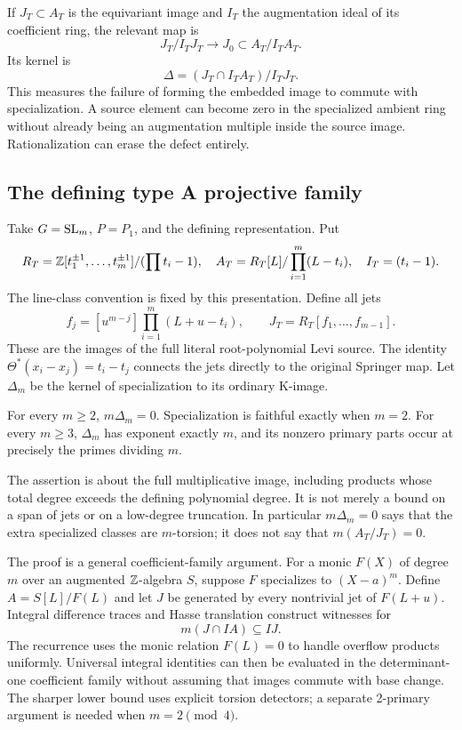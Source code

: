 If $J_T\subset A_T$ is the equivariant image and $I_T$ the augmentation ideal of its coefficient ring, the relevant map is
\[
 J_T/I_TJ_T\longrightarrow J_0\subset A_T/I_TA_T.
\]
Its kernel is
\[
 \Delta=(J_T\cap I_TA_T)/I_TJ_T.
\]
This measures the failure of forming the embedded image to commute with specialization. A source element can become zero in the specialized ambient ring without already being an augmentation multiple inside the source image. Rationalization can erase the defect entirely.

\subsection{The defining type A projective family}
Take $G=\operatorname{SL}_m$, $P=P_1$, and the defining representation. Put
\[
 R_T=\mathbb Z[t_1^{\pm1},\ldots,t_m^{\pm1}]/(\prod t_i-1),\quad
 A_T=R_T[L]/\prod_{i=1}^m(L-t_i),\quad I_T=(t_i-1).
\]
The line-class convention is fixed by this presentation. Define all jets
\[
 f_j=[u^{m-j}]\prod_{i=1}^m(L+u-t_i),\qquad
 J_T=R_T[f_1,\ldots,f_{m-1}].
\]
These are the images of the full literal root-polynomial Levi source. The identity $\Theta^*(x_i-x_j)=t_i-t_j$ connects the jets directly to the original Springer map. Let $\Delta_m$ be the kernel of specialization to its ordinary K-image.

\begin{theorem}
For every $m\ge2$, $m\Delta_m=0$. Specialization is faithful exactly when $m=2$. For every $m\ge3$, $\Delta_m$ has exponent exactly $m$, and its nonzero primary parts occur at precisely the primes dividing $m$.
\end{theorem}
The assertion is about the full multiplicative image, including products whose total degree exceeds the defining polynomial degree. It is not merely a bound on a span of jets or on a low-degree truncation. In particular $m\Delta_m=0$ says that the extra specialized classes are $m$-torsion; it does not say that $m(A_T/J_T)=0$.

The proof is a general coefficient-family argument. For a monic $F(X)$ of degree $m$ over an augmented $\mathbb Z$-algebra $S$, suppose $F$ specializes to $(X-a)^m$. Define $A=S[L]/F(L)$ and let $J$ be generated by every nontrivial jet of $F(L+u)$. Integral difference traces and Hasse translation construct witnesses for
\[
 m(J\cap IA)\subseteq IJ.
\]
The recurrence uses the monic relation $F(L)=0$ to handle overflow products uniformly. Universal integral identities can then be evaluated in the determinant-one coefficient family without assuming that images commute with base change. The sharper lower bound uses explicit torsion detectors; a separate 2-primary argument is needed when $m=2\pmod4$.

